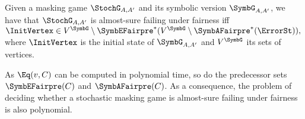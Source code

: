 \begin{theorem}\label{theo:decide-stopping} Given a masking game $\StochG_{A,A'}$ and its symbolic version $\SymbG_{A,A'}$,  we have that 
 $\StochG_{A,A'}$ is almost-sure failing under fairness  iff
$
  \InitVertex \in V^\SymbG \setminus {\SymbEFairpre}^*(V^\SymbG \setminus {\SymbAFairpre}^*(\ErrorSt)),
$
where $\InitVertex$ is the initial state of $\SymbG_{A,A'}$ and $V^\SymbG$ its sets of vertices.
\end{theorem}


As $\Eq(v,C)$ can be computed in polynomial time, so do the predecessor
sets $\SymbEFairpre(C)$ and $\SymbAFairpre(C)$.  As a consequence, the
problem of deciding whether a stochastic masking game is almost-sure
failing under fairness is also polynomial.












